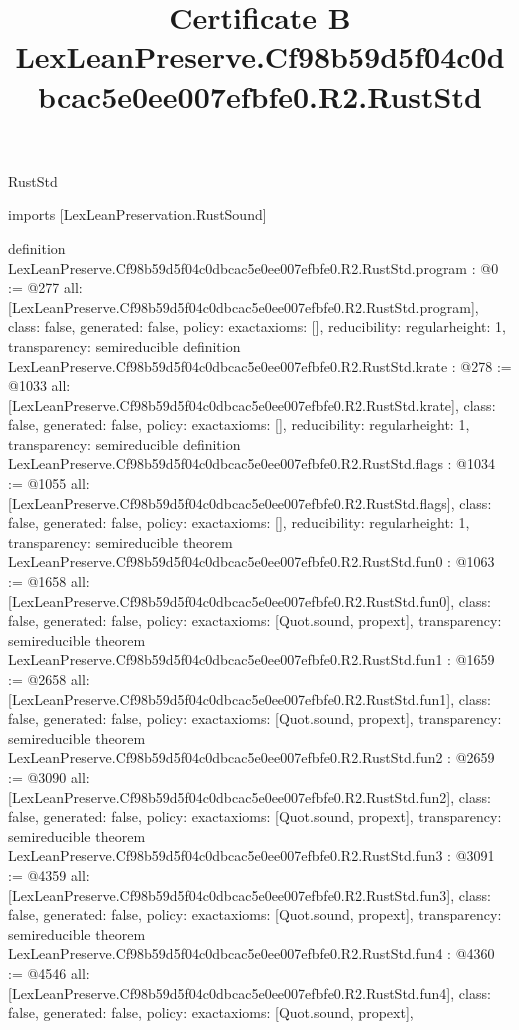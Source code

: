 \begin{lexlean}{RustStd}
\title{Certificate B LexLeanPreserve.Cf98b59d5f04c0dbcac5e0ee007efbfe0.R2.RustStd}
\begin{coremodule}
imports [LexLeanPreservation.RustSound]

definition LexLeanPreserve.Cf98b59d5f04c0dbcac5e0ee007efbfe0.R2.RustStd.program : @0 := @277 {
  all: [LexLeanPreserve.Cf98b59d5f04c0dbcac5e0ee007efbfe0.R2.RustStd.program],
  class: false,
  generated: false,
  policy: exact{axioms: []},
  reducibility: regular{height: 1},
  transparency: semireducible
}
definition LexLeanPreserve.Cf98b59d5f04c0dbcac5e0ee007efbfe0.R2.RustStd.krate : @278 := @1033 {
  all: [LexLeanPreserve.Cf98b59d5f04c0dbcac5e0ee007efbfe0.R2.RustStd.krate],
  class: false,
  generated: false,
  policy: exact{axioms: []},
  reducibility: regular{height: 1},
  transparency: semireducible
}
definition LexLeanPreserve.Cf98b59d5f04c0dbcac5e0ee007efbfe0.R2.RustStd.flags : @1034 := @1055 {
  all: [LexLeanPreserve.Cf98b59d5f04c0dbcac5e0ee007efbfe0.R2.RustStd.flags],
  class: false,
  generated: false,
  policy: exact{axioms: []},
  reducibility: regular{height: 1},
  transparency: semireducible
}
theorem LexLeanPreserve.Cf98b59d5f04c0dbcac5e0ee007efbfe0.R2.RustStd.fun0 : @1063 := @1658 {
  all: [LexLeanPreserve.Cf98b59d5f04c0dbcac5e0ee007efbfe0.R2.RustStd.fun0],
  class: false,
  generated: false,
  policy: exact{axioms: [Quot.sound, propext]},
  transparency: semireducible
}
theorem LexLeanPreserve.Cf98b59d5f04c0dbcac5e0ee007efbfe0.R2.RustStd.fun1 : @1659 := @2658 {
  all: [LexLeanPreserve.Cf98b59d5f04c0dbcac5e0ee007efbfe0.R2.RustStd.fun1],
  class: false,
  generated: false,
  policy: exact{axioms: [Quot.sound, propext]},
  transparency: semireducible
}
theorem LexLeanPreserve.Cf98b59d5f04c0dbcac5e0ee007efbfe0.R2.RustStd.fun2 : @2659 := @3090 {
  all: [LexLeanPreserve.Cf98b59d5f04c0dbcac5e0ee007efbfe0.R2.RustStd.fun2],
  class: false,
  generated: false,
  policy: exact{axioms: [Quot.sound, propext]},
  transparency: semireducible
}
theorem LexLeanPreserve.Cf98b59d5f04c0dbcac5e0ee007efbfe0.R2.RustStd.fun3 : @3091 := @4359 {
  all: [LexLeanPreserve.Cf98b59d5f04c0dbcac5e0ee007efbfe0.R2.RustStd.fun3],
  class: false,
  generated: false,
  policy: exact{axioms: [Quot.sound, propext]},
  transparency: semireducible
}
theorem LexLeanPreserve.Cf98b59d5f04c0dbcac5e0ee007efbfe0.R2.RustStd.fun4 : @4360 := @4546 {
  all: [LexLeanPreserve.Cf98b59d5f04c0dbcac5e0ee007efbfe0.R2.RustStd.fun4],
  class: false,
  generated: false,
  policy: exact{axioms: [Quot.sound, propext]},
}
\end{coremodule}
\end{lexlean}
